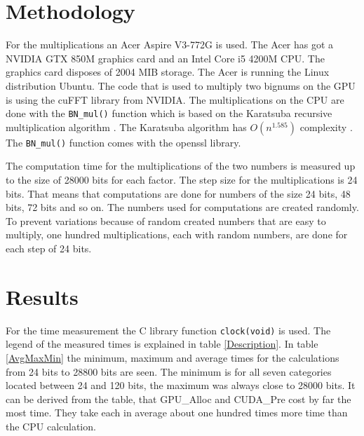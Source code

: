 \documentclass[12pt,a4paper]{article}
\begin{document}
\section{Methodology}
For the multiplications an Acer Aspire V3-772G is used. The Acer has got a NVIDIA GTX 850M graphics card and an Intel Core i5 4200M CPU. The graphics card disposes of 2004 MIB storage. The Acer is running the Linux distribution Ubuntu. The code that is used to multiply two bignums on the GPU is using the cuFFT library from NVIDIA. The multiplications on the CPU are done with the \texttt{BN_mul()} function which is based on the Karatsuba recursive multiplication algorithm \cite{young1995bnmul}. The Karatsuba algorithm has $O(n^{1.585})$ complexity \cite{dietzfelbinger2012eff}. The \texttt{BN_mul()} function comes with the openssl library.

The computation time for the multiplications of the two numbers is measured up to the size of 28000 bits for each factor. The step size for the multiplications is 24 bits. That means that computations are done for numbers of the size 24 bits, 48 bits, 72 bits and so on. The numbers used for computations are created randomly. To prevent variations because of random created numbers that are easy to multiply, one hundred multiplications, each with random numbers, are done for each step of 24 bits.

\newpage %

\section{Results}
For the time measurement the C library function \texttt{clock(void)} is used. The legend of the measured times is explained in table \ref{Description}. In table \ref{AvgMaxMin} the minimum, maximum and average times for the calculations from 24 bits to 28800 bits are seen. The minimum is for all seven categories located between 24 and 120 bits, the maximum was always close to 28000 bits. It can be derived from the table, that GPU\_Alloc and CUDA\_Pre cost by far the most time. They take each in average about one hundred times more time than the CPU calculation.
\end{document}
